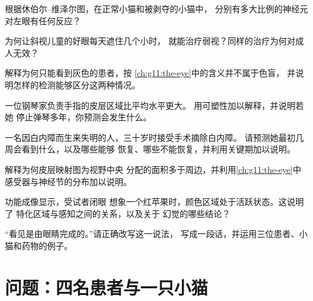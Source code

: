 \begin{exercise}[$\star\star$]\label{exo:g11:vision-and-brain:8}
根据休伯尔–维泽尔图，在正常小猫和被剥夺的小猫中，
分别有多大比例的神经元对左眼有任何反应？
\end{exercise}

\begin{exercise}[$\star\star$]\label{exo:g11:vision-and-brain:9}
为何让斜视儿童的好眼每天遮住几个小时，
就能治疗弱视？同样的治疗为何对成人无效？
\end{exercise}

\begin{exercise}[$\star\star$]\label{exo:g11:vision-and-brain:10}
解释为何只能看到灰色的患者，按
\cref{ch:g11:the-eye}中的含义并不属于色盲，
并说明怎样的检测能够区分这两种情况。
\end{exercise}

\begin{exercise}[$\star\star$]\label{exo:g11:vision-and-brain:11}
一位钢琴家负责手指的皮层区域比平均水平更大。
用可塑性加以解释，并说明若她
停止弹琴多年，你预测会发生什么。
\end{exercise}

\begin{exercise}[$\star\star\star$]\label{exo:g11:vision-and-brain:12}
一名因白内障而生来失明的人，三十岁时接受手术摘除白内障。
请预测她最初几周会看到什么，以及哪些能够
恢复、哪些不能恢复，并利用关键期加以说明。
\end{exercise}

\begin{exercise}[$\star\star\star$]\label{exo:g11:vision-and-brain:13}
解释为何皮层映射图为视野中央
分配的面积多于周边，并利用\cref{ch:g11:the-eye}中
感受器与神经节的分布加以说明。
\end{exercise}

\begin{exercise}[$\star\star\star$]\label{exo:g11:vision-and-brain:14}
功能成像显示，受试者闭眼
想象一个红苹果时，颜色区域处于活跃状态。这说明了
特化区域与感知之间的关系，以及关于
幻觉的哪些结论？
\end{exercise}

\begin{exercise}[$\star\star\star$]\label{exo:g11:vision-and-brain:15}
“看见是由眼睛完成的。”请正确改写这一说法，
写成一段话，并运用三位患者、小猫和药物的例子。
\end{exercise}

\section{问题：四名患者与一只小猫}

